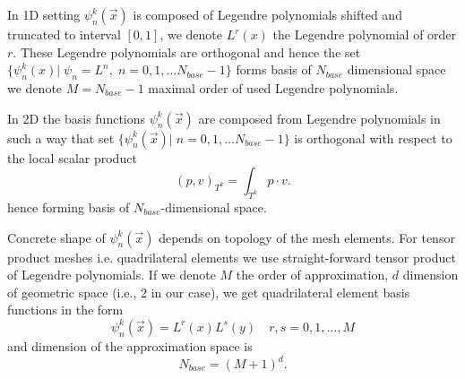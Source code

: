 In 1D setting $\psi_n^k(\vec{x})$ is composed of Legendre polynomials shifted 
and truncated to interval $[0, 1]$, we denote $L^r(x)$ the Legendre 
polynomial of order $r$. These Legendre polynomials are orthogonal and hence 
the set  $\{\psi_n^k(x)| \; \psi_n = L^n, \; n = 0,1, \dots  N_{base} - 
1\}$ forms basis of  $N_{base}$ dimensional space we denote $M = N_{base} - 
1$ maximal order of used Legendre polynomials.

In 2D the basis functions $\psi_n^k(\vec{x})$ are composed from Legendre 
polynomials  in such a way that set $\{\psi_n^k(\vec{x})| \; n = 0,1, \dots  
N_{base} - 1\}$ is orthogonal with respect to the local 
scalar product
\begin{equation}
    \label{eq:scalar_prod_dk}
    (p, v)_{T^k} = \int_{T^k} p \cdot v.
\end{equation}
hence forming basis of $N_{base}$-dimensional space. 


Concrete shape of $\psi_n^k(\vec{x})$ depends on topology of the mesh elements. For 
tensor product meshes i.e. quadrilateral elements we use straight-forward 
tensor product of Legendre polynomials. If we denote $M$ the order of 
approximation, $d$ dimension of geometric space (i.e., 2 in our case), we get 
quadrilateral element basis functions in the form
\begin{equation}
\psi_n^k(\vec{x}) = L^r(x)L^s(y)\quad r, s = 0,1, \dots, M
\end{equation}
and dimension of the approximation space is
\begin{equation}
    N_{base} = (M + 1)^d.
\end{equation}

